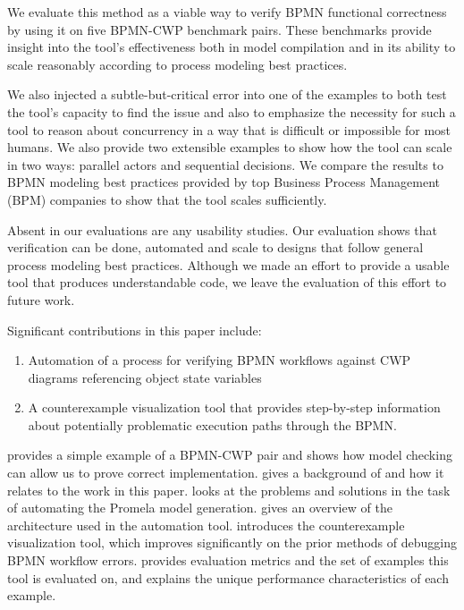 We evaluate this method as a viable way to verify BPMN functional correctness by using it on five BPMN-CWP benchmark pairs. These benchmarks provide insight into the tool's effectiveness both in model compilation and in its ability to scale reasonably according to process modeling best practices.

We also injected a subtle-but-critical error into one of the examples to both test the tool's capacity to find the issue and also to emphasize the necessity for such a tool to reason about concurrency in a way that is difficult or impossible for most humans. We also provide two extensible examples to show how the tool can scale in two ways: parallel actors and sequential decisions. We compare the results to BPMN modeling best practices provided by top Business Process Management (BPM) companies to show that the tool scales sufficiently.

Absent in our evaluations are any usability studies. Our evaluation shows that verification can be done, automated and scale to designs that follow general process modeling best practices. Although we made an effort to provide a usable tool that produces understandable code, we leave the evaluation of this effort to future work.

Significant contributions in this paper include:
\begin{enumerate}
    \item Automation of a process for verifying BPMN workflows against CWP diagrams referencing object state variables
    \item A counterexample visualization tool that provides step-by-step information about potentially problematic execution paths through the BPMN.
\end{enumerate}

 provides a simple example of a BPMN-CWP pair and shows how model checking can allow us to prove correct implementation.
 gives a background of \cite{mercer22} and how it relates to the work in this paper.
 looks at the problems and solutions in the task of automating the Promela model generation.
 gives an overview of the architecture used in the automation tool.
 introduces the counterexample visualization tool, which improves significantly on the prior methods of debugging BPMN workflow errors.
 provides evaluation metrics and the set of examples this tool is evaluated on, and explains the unique performance characteristics of each example.
